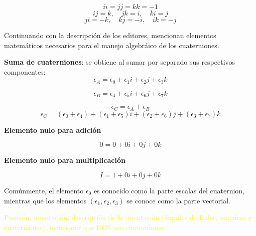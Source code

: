 \begin{equation*}
    ii=jj=kk=-1
\end{equation*}
\begin{equation*}
    ij=k,\quad jk=i, \quad ki=j
\end{equation*}
\begin{equation*}
    ji=-k, \quad kj = -i, \quad ik = -j
\end{equation*}

Continuando con la descripción de los editores, mencionan elementos matemáticos necesarios para el manejo algebráico de los cuaterniones.

\textbf{Suma de cuaterniones}: se obtiene al sumar por separado sus respectivos componentes:\\
\begin{equation*}
    \epsilon_{A} = \epsilon_{0}+\epsilon_{1}i+
    \epsilon_{2}j+
    \epsilon_{3}k
\end{equation*}

\begin{equation*}
    \epsilon_{B} = \epsilon_{4}+\epsilon_{5}i+
    \epsilon_{6}j+
    \epsilon_{7}k
\end{equation*}

\begin{equation*}
    \epsilon_{C} = \epsilon_{A} + \epsilon_{B}
\end{equation*}
\begin{equation*}
\epsilon_{C} =                     (\epsilon_{0}+
    \epsilon_{4})+(\epsilon_{1}+\epsilon_{5})i+
    (\epsilon_{2}+\epsilon_{6})j+
    (\epsilon_{3}+\epsilon_{7})k
\end{equation*}

\textbf{Elemento nulo para adición}

\begin{equation*}
    0 = 0 + 0i + 0j + 0k
\end{equation*}

\textbf{Elemento nulo para multiplicación}

\begin{equation*}
    I = 1 + 0i + 0j + 0k
\end{equation*}

Comúnmente, el elemento $\epsilon_{0}$ es conocido como la parte escalas del cuaternion, mientras que los elementos $(\epsilon_{1},\epsilon_{2}, \epsilon_{3})$ se conoce como la parte vectorial.

\textcolor{yellow}{Posición, orientación, descripción de la orientación (ángulos de Euler, matrices y cuaterniones), mencionar que ROS usa cuaterniones. }

